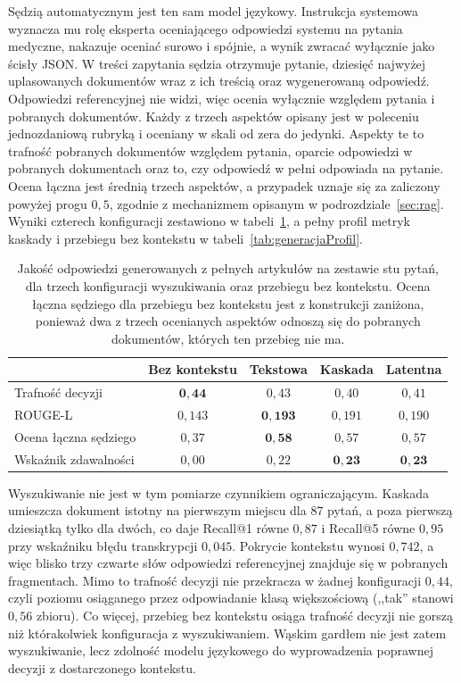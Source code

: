 Sędzią automatycznym jest ten sam model językowy. Instrukcja systemowa wyznacza mu rolę
eksperta oceniającego odpowiedzi systemu na pytania medyczne, nakazuje oceniać surowo
i spójnie, a wynik zwracać wyłącznie jako ścisły JSON. W treści zapytania sędzia otrzymuje
pytanie, dziesięć najwyżej uplasowanych dokumentów wraz z ich treścią oraz wygenerowaną
odpowiedź. Odpowiedzi referencyjnej nie widzi, więc ocenia wyłącznie względem pytania
i pobranych dokumentów. Każdy z trzech aspektów opisany jest w poleceniu jednozdaniową rubryką
i oceniany w skali od zera do jedynki. Aspekty te to trafność pobranych dokumentów względem
pytania, oparcie odpowiedzi w pobranych dokumentach oraz to, czy odpowiedź w pełni odpowiada na
pytanie. Ocena łączna jest średnią trzech aspektów, a przypadek uznaje się za zaliczony powyżej
progu $0{,}5$, zgodnie z mechanizmem opisanym w podrozdziale~\ref{sec:rag}. Wyniki czterech
konfiguracji zestawiono w tabeli~\ref{tab:generacjaPorownanie}, a pełny profil metryk kaskady
i przebiegu bez kontekstu w tabeli~\ref{tab:generacjaProfil}.

\begin{table}[htbp]
\centering
\small
\begin{tabular}{@{}lcccc@{}}
\toprule
& \textbf{Bez kontekstu} & \textbf{Tekstowa} & \textbf{Kaskada} & \textbf{Latentna} \\
\midrule
Trafność decyzji        & $\mathbf{0{,}44}$  & $0{,}43$  & $0{,}40$  & $0{,}41$ \\
ROUGE-L                 & $0{,}143$ & $\mathbf{0{,}193}$ & $0{,}191$ & $0{,}190$ \\
Ocena łączna sędziego   & $0{,}37$  & $\mathbf{0{,}58}$  & $0{,}57$  & $0{,}57$ \\
Wskaźnik zdawalności    & $0{,}00$  & $0{,}22$  & $\mathbf{0{,}23}$  & $\mathbf{0{,}23}$ \\
\bottomrule
\end{tabular}
\caption{Jakość odpowiedzi generowanych z pełnych artykułów na zestawie stu pytań, dla trzech
konfiguracji wyszukiwania oraz przebiegu bez kontekstu. Ocena łączna sędziego dla przebiegu bez
kontekstu jest z konstrukcji zaniżona, ponieważ dwa z trzech ocenianych aspektów odnoszą się do
pobranych dokumentów, których ten przebieg nie ma.}
\label{tab:generacjaPorownanie}
\end{table}

Wyszukiwanie nie jest w tym pomiarze czynnikiem ograniczającym. Kaskada umieszcza dokument
istotny na pierwszym miejscu dla 87 pytań, a poza pierwszą dziesiątką tylko dla dwóch, co daje
Recall@1 równe $0{,}87$ i Recall@5 równe $0{,}95$ przy wskaźniku błędu transkrypcji $0{,}045$.
Pokrycie kontekstu wynosi $0{,}742$, a więc blisko trzy czwarte słów odpowiedzi referencyjnej
znajduje się w pobranych fragmentach. Mimo to trafność decyzji nie przekracza w żadnej
konfiguracji $0{,}44$, czyli poziomu osiąganego przez odpowiadanie klasą większościową
(,,tak'' stanowi $0{,}56$ zbioru). Co więcej, przebieg bez kontekstu osiąga trafność decyzji
nie gorszą niż którakolwiek konfiguracja z wyszukiwaniem. Wąskim gardłem nie jest zatem
wyszukiwanie, lecz zdolność modelu językowego do wyprowadzenia poprawnej decyzji z dostarczonego
kontekstu.

